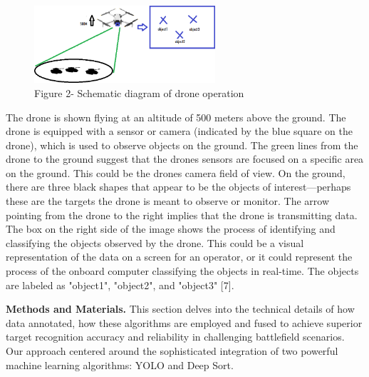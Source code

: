 \begin{figure}[H]
	\centering
	\includegraphics[width=0.6\textwidth]{assets/12}
	\caption*{Figure 2- Schematic diagram of drone operation}
\end{figure}

The drone is shown flying at an altitude of 500 meters above the ground. The
drone is equipped with a sensor or camera (indicated by the blue square
on the drone), which is used to observe objects on the ground. The green
lines from the drone to the ground suggest that the
drone\textquotesingle s sensors are focused on a specific area on the
ground. This could be the drone\textquotesingle s camera field of view.
On the ground, there are three black shapes that appear to be the
objects of interest---perhaps these are the targets the drone is meant
to observe or monitor. The arrow pointing from the drone to the right
implies that the drone is transmitting data. The box on the right side
of the image shows the process of identifying and classifying the
objects observed by the drone. This could be a visual representation of
the data on a screen for an operator, or it could represent the process
of the onboard computer classifying the objects in real-time. The
objects are labeled as "object1", "object2", and "object3" {[}7{]}.

{\bfseries Methods and Materials.} This section delves into the technical
details of how data annotated, how these algorithms are employed and
fused to achieve superior target recognition accuracy and reliability in
challenging battlefield scenarios. Our approach centered around the
sophisticated integration of two powerful machine learning algorithms:
YOLO and Deep Sort.

